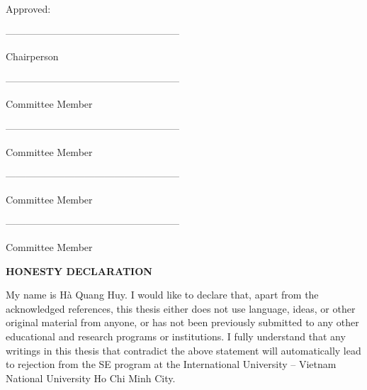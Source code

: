 \vspace{2cm}
\noindent Approved:

\begin{flushright}
    \begin{minipage}{7.5cm}
        \raggedright
        -----------------------------------------------------
        \vspace{-0.6cm}
        
        Chairperson

        \vspace{1.75cm}

        -----------------------------------------------------
        \vspace{-0.6cm}
        
        Committee Member

        \vspace{1.75cm}
        
        -----------------------------------------------------
        \vspace{-0.6cm}
        
        Committee Member
        
        \vspace{1.75cm}

        -----------------------------------------------------
        \vspace{-0.6cm}
        
        Committee Member
        
        \vspace{1.75cm}

        -----------------------------------------------------
        \vspace{-0.6cm}

        Committee Member
    \end{minipage}
\end{flushright}


\newpage
\begin{center}
    \fontsize{14}{16}\selectfont
    \textbf{HONESTY DECLARATION}
\end{center}
\vspace{0.5cm}
\doublespacing
\justifying
My name is Hà Quang Huy. I would like to declare that, apart from the acknowledged references, this thesis either does not use language, ideas, or other original material from anyone, or has not been previously submitted to any other educational and research programs or institutions. I fully understand that any writings in this thesis that contradict the above statement will automatically lead to rejection from the SE program at the International University – Vietnam National University Ho Chi Minh City.
\vspace{5cm}

